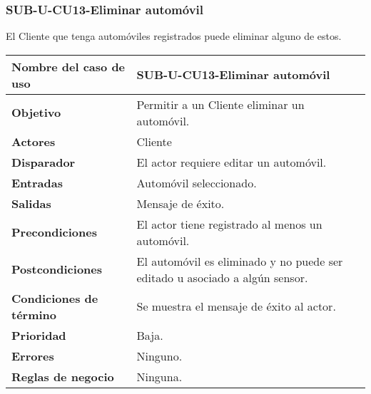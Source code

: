 \subsubsection{SUB-U-CU13-Eliminar automóvil}\label{SUB-U-CU13}
El Cliente que tenga automóviles registrados puede eliminar alguno de estos.

\begin{longtable}{|J{5cm}|J{10.3cm}|}
	\hline
	\textbf{Nombre del caso de uso} &
		SUB-U-CU13-Eliminar automóvil \\ \hline
	\textbf{Objetivo} &
		Permitir a un Cliente eliminar un automóvil. \\ \hline
	\textbf{Actores} &
		Cliente \\ \hline 
	\textbf{Disparador} & 
		El actor requiere editar un automóvil. \\ \hline 
	\textbf{Entradas} & Automóvil seleccionado.
		\\ \hline 
	\textbf{Salidas} & Mensaje de éxito.
		\\ \hline
	\textbf{Precondiciones} & El actor tiene registrado al menos un automóvil.
		\\ \hline
	\textbf{Postcondiciones} & El automóvil es eliminado y no puede ser editado u asociado a algún sensor.
		\\ \hline
	\textbf{Condiciones de término} & Se muestra el mensaje de éxito al actor.
		\\ \hline 
	\textbf{Prioridad} & 
		Baja. \\ \hline
	\textbf{Errores} & Ninguno.
		\\ \hline
	\textbf{Reglas de negocio} & Ninguna.
		 \\ \hline
\end{longtable}

